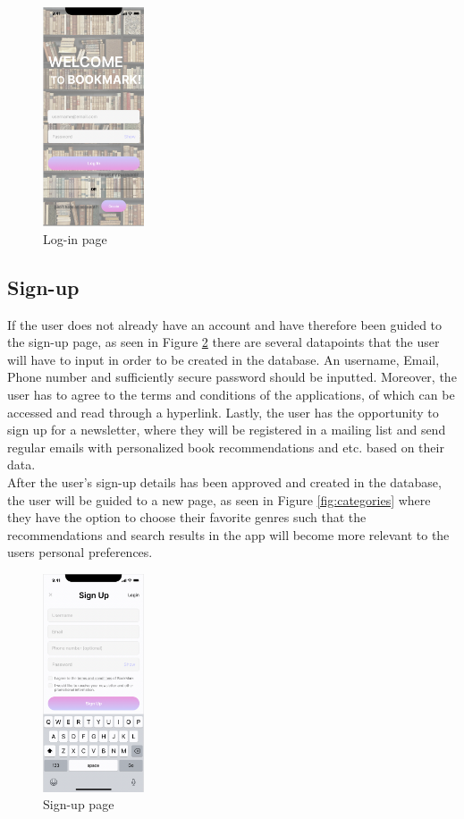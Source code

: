 \documentclass[conference]{IEEEtran}
\begin{document}
\begin{figure}[h]
    \centering
    \includegraphics[width=3cm]{Ressources/Specifications/Login.png}
    \caption{Log-in page}
    \label{fig:login}
\end{figure}

\subsection{Sign-up}
If the user does not already have an account and have therefore been guided to the sign-up page, as seen in Figure \ref{fig:signup} there are several datapoints that the user will have to input in order to be created in the database. An username, Email, Phone number and sufficiently secure password should be inputted. Moreover, the user has to agree to the terms and conditions of the applications, of which can be accessed and read through a hyperlink. Lastly, the user has the opportunity to sign up for a newsletter, where they will be registered in a mailing list and send regular emails with personalized book recommendations and etc. based on their data. \\
After the user's sign-up details has been approved and created in the database, the user will be guided to a new page, as seen in Figure \ref{fig:categories} where they have the option to choose their favorite genres such that the recommendations and search results in the app will become more relevant to the users personal preferences. 


\begin{figure}[h]
    \centering
    \includegraphics[width=3cm]{Ressources/Specifications/signup.png}
    \caption{Sign-up page}
    \label{fig:signup}
\end{figure}
\end{document}

